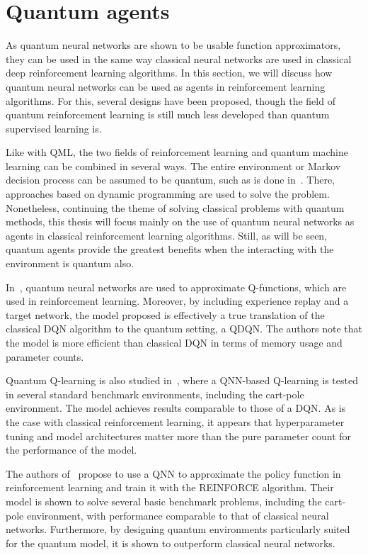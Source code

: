 \section{Quantum agents}
\label{sec:quantum_agents}

As quantum neural networks are shown to be usable function approximators, they can be used in the same way classical neural networks are used in classical deep reinforcement learning algorithms.
In this section, we will discuss how quantum neural networks can be used as agents in reinforcement learning algorithms.
For this, several designs have been proposed, though the field of quantum reinforcement learning is still much less developed than quantum supervised learning is.

Like with QML, the two fields of reinforcement learning and quantum machine learning can be combined in several ways.
The entire environment or Markov decision process can be assumed to be quantum, such as is done in~\autocite{ying2021}.
There, approaches based on dynamic programming are used to solve the problem.
Nonetheless, continuing the theme of solving classical problems with quantum methods, this thesis will focus mainly on the use of quantum neural networks as agents in classical reinforcement learning algorithms.
Still, as will be seen, quantum agents provide the greatest benefits when the interacting with the environment is quantum also.

In~\autocite{chen2020}, quantum neural networks are used to approximate Q-functions, which are used in reinforcement learning.
Moreover, by including experience replay and a target network, the model proposed is effectively a true translation of the classical DQN algorithm to the quantum setting, a QDQN.
The authors note that the model is more efficient than classical DQN in terms of memory usage and parameter counts.

Quantum Q-learning is also studied in~\autocite{skolik2022}, where a QNN-based Q-learning is tested in several standard benchmark environments, including the cart-pole environment.
The model achieves results comparable to those of a DQN.
As is the case with classical reinforcement learning, it appears that hyperparameter tuning and model architectures matter more than the pure parameter count for the performance of the model.

The authors of~\autocite{jerbi2021} propose to use a QNN to approximate the policy function in reinforcement learning and train it with the REINFORCE algorithm.
Their model is shown to solve several basic benchmark problems, including the cart-pole environment, with performance comparable to that of classical neural networks.
Furthermore, by designing quantum environments particularly suited for the quantum model, it is shown to outperform classical neural networks.

